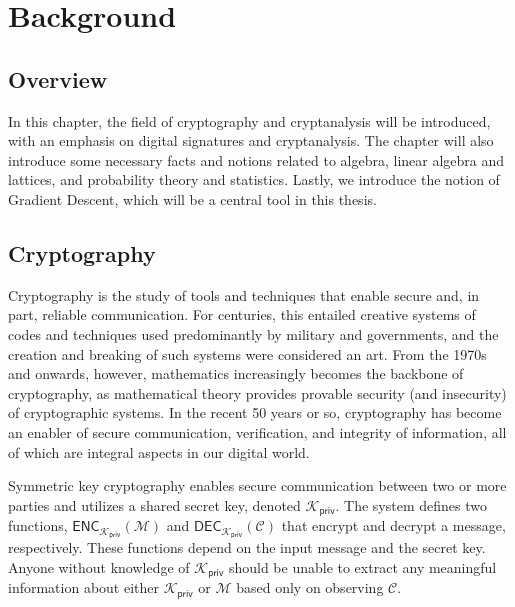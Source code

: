 \newcommand{\privkey}{\mathcal{K}_{\mathsf{priv}}}
\newcommand{\pubkey}{\mathcal{K}_{\mathsf{pub}}}
\newcommand{\enc}[1]{\mathsf{ENC}_{\privkey}(#1)}
\newcommand{\encpub}[1]{\mathsf{ENC}_{\pubkey}(#1)}
\newcommand{\dec}[1]{\mathsf{DEC}_{\privkey}(#1)}

\chapter{Background}
\section{Overview}
In this chapter, the field of cryptography and cryptanalysis will be introduced, with an emphasis on digital signatures and cryptanalysis.  
The chapter will also introduce some necessary facts and notions related to algebra, linear algebra and lattices, and probability theory and statistics.
Lastly, we introduce the notion of Gradient Descent, which will be a central tool in this thesis.

\section{Cryptography}
Cryptography is the study of tools and techniques that enable secure and, in part, reliable communication. For centuries, this entailed creative systems of codes and techniques used predominantly by military and governments,
and the creation and breaking of such systems were considered an art. %
From the 1970s and onwards, however, mathematics increasingly becomes the backbone of cryptography, as mathematical theory provides provable security (and insecurity) of cryptographic systems. 
In the recent 50 years or so, cryptography has become an enabler of secure communication, verification, and integrity of information, all of which are integral aspects in our digital world. \cite{KL20}

Symmetric key cryptography enables secure communication between two or more parties and utilizes a shared secret key, denoted $\privkey$. 
The system defines two functions, $\enc{\mathcal{M}}$ and $\dec{\mathcal{C}}$ that encrypt and decrypt a message, respectively. These functions depend on the input message and the secret key. 
Anyone without knowledge of $\privkey$ should be unable to
extract any meaningful information about either $\privkey$ or $\mathcal{M}$ based only on observing $\mathcal{C}$.

